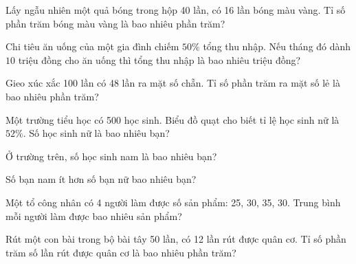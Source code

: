 \begin{ex}
  Lấy ngẫu nhiên một quả bóng trong hộp 40 lần, có 16 lần bóng màu vàng. Tỉ số phần trăm bóng màu vàng là bao nhiêu phần trăm?
\end{ex}

\begin{ex}
  Chi tiêu ăn uống của một gia đình chiếm $50\%$ tổng thu nhập. Nếu tháng đó dành $10$ triệu đồng cho ăn uống thì tổng thu nhập là bao nhiêu triệu đồng?
\end{ex}

\begin{ex}
  Gieo xúc xắc 100 lần có 48 lần ra mặt số chẵn. Tỉ số phần trăm ra mặt số lẻ là bao nhiêu phần trăm?
\end{ex}

\begin{ex}
  Một trường tiểu học có 500 học sinh. Biểu đồ quạt cho biết tỉ lệ học sinh nữ là $52\%$. Số học sinh nữ là bao nhiêu bạn?
\end{ex}

\begin{ex}
  Ở trường trên, số học sinh nam là bao nhiêu bạn?
\end{ex}

\begin{ex}
  Số bạn nam ít hơn số bạn nữ bao nhiêu bạn?
\end{ex}

\begin{ex}
  Một tổ công nhân có 4 người làm được số sản phẩm: 25, 30, 35, 30. Trung bình mỗi người làm được bao nhiêu sản phẩm?
\end{ex}

\begin{ex}
  Rút một con bài trong bộ bài tây 50 lần, có 12 lần rút được quân cơ. Tỉ số phần trăm số lần rút được quân cơ là bao nhiêu phần trăm?
\end{ex}
